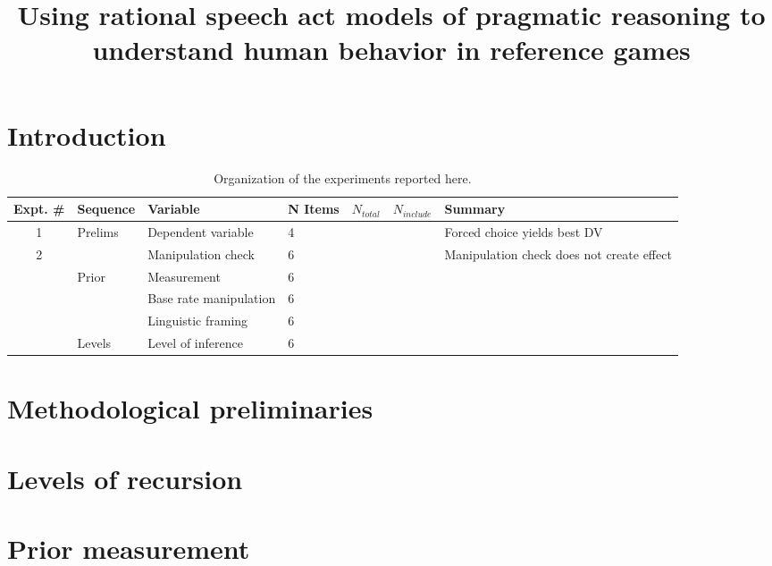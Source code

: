 \documentclass[man,noapacite]{apa2}
\title{\vspace{-10ex}Using rational speech act models of pragmatic reasoning to understand human behavior in reference games}
\begin{document}
\maketitle                            


\section{Introduction}







\begin{table}[ht]
\caption{Organization of the experiments reported here.}
\begin{tabular}{cllllll}
\hline
Expt. \# & Sequence & Variable & N Items & $N_{total}$ & $N_{include}$ & Summary \\
\hline
1 & Prelims & Dependent variable & 4 & & & Forced choice yields best DV \\
2 & & Manipulation check & 6 & & & Manipulation check does not create effect \\

& Prior & Measurement & 6 & & & \\
&  & Base rate manipulation & 6 & & & \\

&  & Linguistic framing & 6 & & & \\
 & Levels & Level of inference & 6 & & & \\


\hline
\end{tabular}
\end{table}

\section{Methodological preliminaries}



\section{Levels of recursion}

\section{Prior measurement}
\end{document}
